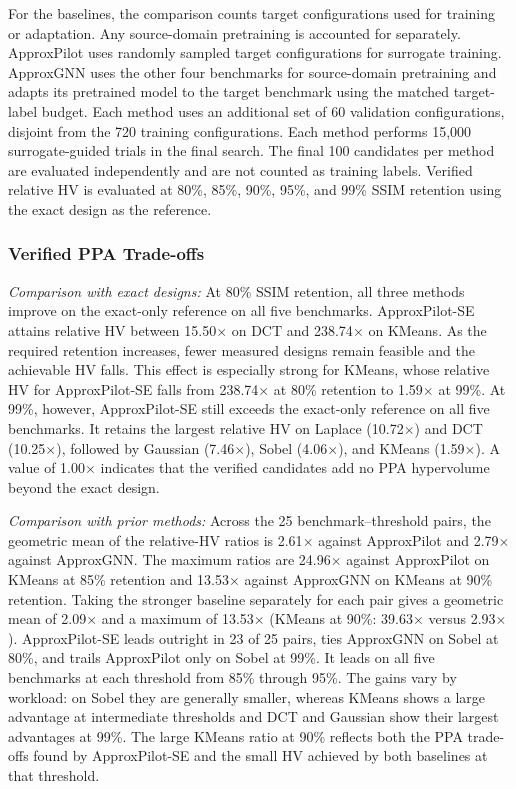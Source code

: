 For the baselines, the comparison counts target configurations used for training or adaptation. Any source-domain pretraining is accounted for separately. ApproxPilot uses randomly sampled target configurations for surrogate training. ApproxGNN uses the other four benchmarks for source-domain pretraining and adapts its pretrained model to the target benchmark using the matched target-label budget. Each method uses an additional set of 60 validation configurations, disjoint from the 720 training configurations. Each method performs 15,000 surrogate-guided trials in the final search. The final 100 candidates per method are evaluated independently and are not counted as training labels. Verified relative HV is evaluated at 80\%, 85\%, 90\%, 95\%, and 99\% SSIM retention using the exact design as the reference.



\subsubsection{Verified PPA Trade-offs}
\noindent\textit{Comparison with exact designs:}
At 80\% SSIM retention, all three methods improve on the exact-only reference on all five benchmarks. ApproxPilot-SE attains relative HV between 15.50$\times$ on DCT and 238.74$\times$ on KMeans. As the required retention increases, fewer measured designs remain feasible and the achievable HV falls. This effect is especially strong for KMeans, whose relative HV for ApproxPilot-SE falls from 238.74$\times$ at 80\% retention to 1.59$\times$ at 99\%. At 99\%, however, ApproxPilot-SE still exceeds the exact-only reference on all five benchmarks. It retains the largest relative HV on Laplace (10.72$\times$) and DCT (10.25$\times$), followed by Gaussian (7.46$\times$), Sobel (4.06$\times$), and KMeans (1.59$\times$). A value of 1.00$\times$ indicates that the verified candidates add no PPA hypervolume beyond the exact design.

\noindent\textit{Comparison with prior methods:}
Across the 25 benchmark--threshold pairs, the geometric mean of the relative-HV ratios is 2.61$\times$ against ApproxPilot and 2.79$\times$ against ApproxGNN. The maximum ratios are 24.96$\times$ against ApproxPilot on KMeans at 85\% retention and 13.53$\times$ against ApproxGNN on KMeans at 90\% retention. Taking the stronger baseline separately for each pair gives a geometric mean of 2.09$\times$ and a maximum of 13.53$\times$ (KMeans at 90\%: 39.63$\times$ versus 2.93$\times$). ApproxPilot-SE leads outright in 23 of 25 pairs, ties ApproxGNN on Sobel at 80\%, and trails ApproxPilot only on Sobel at 99\%. It leads on all five benchmarks at each threshold from 85\% through 95\%. The gains vary by workload: on Sobel they are generally smaller, whereas KMeans shows a large advantage at intermediate thresholds and DCT and Gaussian show their largest advantages at 99\%. The large KMeans ratio at 90\% reflects both the PPA trade-offs found by ApproxPilot-SE and the small HV achieved by both baselines at that threshold.

